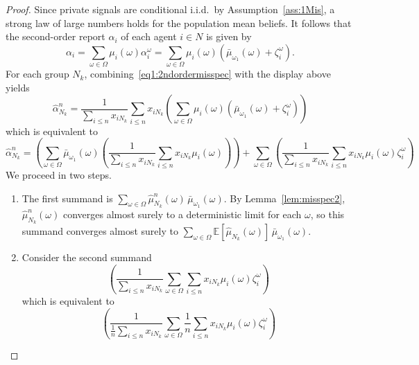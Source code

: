 \documentclass[12pt,reqno]{amsart}
\begin{document}
\begin{proof}
    Since private signals are conditional i.i.d.\ by Assumption~\ref{ass:1Mis}, a strong law of large numbers holds for the population mean beliefs. It follows that the second-order report $\alpha_i$ of each agent $i\in N$ is given by
\begin{equation*}
    \alpha_i=\sum_{\omega \in \Omega}\mu_i(\omega) \alpha _{i}^{\omega } =\sum_{\omega \in \Omega}\mu_i(\omega) \left(\bar{\mu}_{\omega_1}(\omega )+\zeta _{i}^{\omega } \right).
\end{equation*} 
For each group $N_k$, combining~\eqref{eq1:2ndordermisspec} with the display above yields
 \begin{equation*}
        \hat{\alpha}_{N_k}^n=\frac{1}{\displaystyle\sum_{i\leq n}x_{iN_k}}\sum_{i\leq n}x_{iN_k} \left( \sum_{\omega \in \Omega}\mu_i(\omega) \left(\bar{\mu}_{\omega_1}(\omega )+\zeta_{i}^{\omega } \right)\right)
    \end{equation*}
    which is equivalent to
\begin{equation*}
        \hat{\alpha}_{N_k}^n=\left(\sum_{\omega \in \Omega}\bar{\mu}_{\omega_1}(\omega )\left(\frac{1}{\displaystyle\sum_{i \leq n}x_{iN_k}}\sum_{i \leq  n}x_{iN_k}\mu_i(\omega) \right)\right)+\sum_{\omega \in \Omega}\left(\frac{1}{\displaystyle\sum_{i\leq n}x_{iN_k}}\sum_{i \leq n}x_{iN_k}\mu_i(\omega)\zeta_{i}^{\omega } \right)
    \end{equation*}
We proceed in two steps.
\begin{enumerate}
    \item The first summand is $\displaystyle\sum_{\omega \in \Omega}\hat{\mu}_{N_k}^n(\omega)\,\bar{\mu}_{\omega_1}(\omega )$. By Lemma~\ref{lem:misspec2}, $\hat{\mu}_{N_k}^n(\omega)$ converges almost surely to a deterministic limit for each $\omega$, so this summand converges almost surely to $\sum_{\omega\in\Omega}\mathbb{E}[\hat{\mu}_{N_k}(\omega)]\,\bar{\mu}_{\omega_1}(\omega)$.
    \item Consider the second summand
    \begin{equation*}
        \left(\frac{1}{\displaystyle\sum_{i\leq n}x_{iN_k}}\sum_{\omega \in \Omega}\sum_{i\leq n}x_{iN_k}\mu_i(\omega)\zeta_{i}^{\omega } \right)
    \end{equation*}
    which is equivalent to
    \begin{equation*}
        \left(\frac{1}{\frac1n\displaystyle\sum_{i\leq n}x_{iN_k}}\sum_{\omega \in \Omega}\frac1n \sum_{i\leq n}x_{iN_k}\mu_i(\omega)\zeta_{i}^{\omega } \right)
    \end{equation*}

\end{enumerate}
\end{proof}
\end{document}

